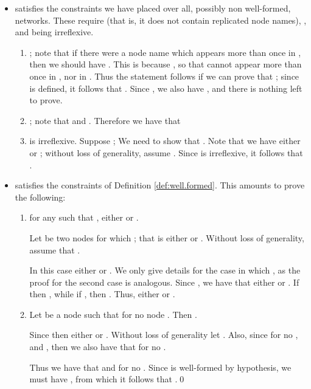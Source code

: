 \documentclass{LMCS}
\begin{document}
\begin{itemize}
\item  satisfies the constraints we 
have placed over all, possibly non well-formed, networks. These require 
 (that is, it does not contain replicated node names),
, and 
 being irreflexive.

\begin{enumerate}

\item ; note that if there were a node name  which appears more 
than once in , then we should have . This is 
because , so that  cannot appear more than once in , nor in . 
Thus the statement follows if we can prove that ; 
since  is defined, 
it follows that 
. 
Since ,
we also have , and there is nothing left to prove.

\item ; 
note that  and . Therefore we have that
 


\item  is irreflexive. Suppose ; We need to 
show that .
Note that we have either  or ; 
without loss of generality, assume . Since  is irreflexive, 
it follows that .
\end{enumerate}

\item  satisfies the constraints 
of Definition \ref{def:well.formed}. This amounts to prove the following:

\begin{enumerate}

\item for any  such that , 
either  or .

Let  be two nodes for which ; 
that is either  or . 
Without loss of generality, assume that .

In this case either  or . 
We only give details for the case in which , as the proof 
for the second case is analogous. 
Since , we have 
that either  or . 
If  then , while 
if , then . 
Thus, either  or .

\item Let  be a node such that  
for no node . Then .

Since  then either  or . 
Without loss of generality let . Also, since  
for no ,  and , then 
we also have that  for no . 

Thus we have that  and  for no . 
Since  is well-formed by hypothesis, we must have , from which it 
follows that .\qed
\end{enumerate}
\end{itemize}
\end{document}
